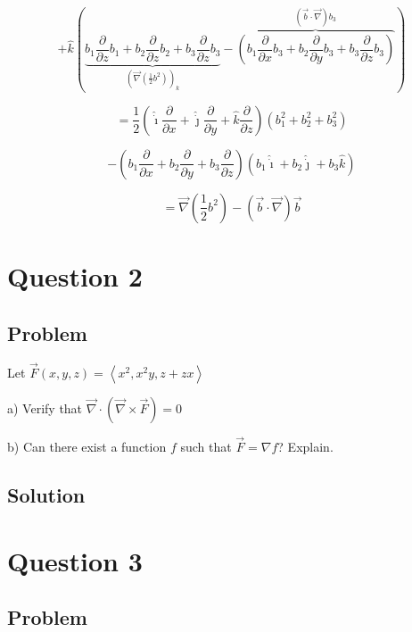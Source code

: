 \documentclass[12pt]{article}
\begin{document}
\[
    + \hat{k}
    \left(
    \underbrace{b_{1} \frac{\partial}{\partial z} b_{1}
        + b_{2} \frac{\partial}{\partial z} b_{2}
        + b_{3} \frac{\partial}{\partial z} b_{3}}
    _{{\left(\vec{\nabla} \left(\frac{1}{2} b^2\right)\right)}_k}
    - \overbrace{\left(b_{1} \frac{\partial}{\partial x} b_{3}
        + b_{2} \frac{\partial}{\partial y} b_{3}
        + b_{3} \frac{\partial}{\partial z} b_{3}\right)}
    ^{(\vec{b} \cdot \vec{\nabla}) b_{3}}
    \right)
\]

\[
    =
    \frac{1}{2}
    \left(
    \hat{\dot{\imath}}
    \frac{\partial}{\partial x}
    + \hat{\dot{\jmath}}
    \frac{\partial}{\partial y}
    + \hat{k}
    \frac{\partial}{\partial z}
    \right)
    \left(
    b_{1}^2+b_{2}^2+b_{3}^2
    \right)
\]

\[
    - \left(
    b_{1} \frac{\partial}{\partial x}
    + b_{2} \frac{\partial}{\partial y}
    + b_{3} \frac{\partial}{\partial z}
    \right)
    \left(
    b_{1} \hat{\dot{\imath}}
    + b_{2} \hat{\dot{\jmath}}
    + b_{3} \hat{k}
    \right)
\]

\[
    = \vec{\nabla} \left(\frac{1}{2} b^2\right) - (\vec{b} \cdot \vec{\nabla}) \vec{b}
\]

\newpage
\section{Question 2}

\subsection{Problem}

Let \(\vec{F}(x, y, z)=\left\langle x^2, x^2 y, z+z x\right\rangle \)

a) Verify that \(\vec{\nabla} \cdot(\vec{\nabla} \times \vec{F})=0\)

b) Can there exist a function \(f\) such that \(\vec{F}=\nabla f\)? Explain.

\subsection{Solution}



\newpage
\section{Question 3}

\subsection{Problem}
\end{document}
